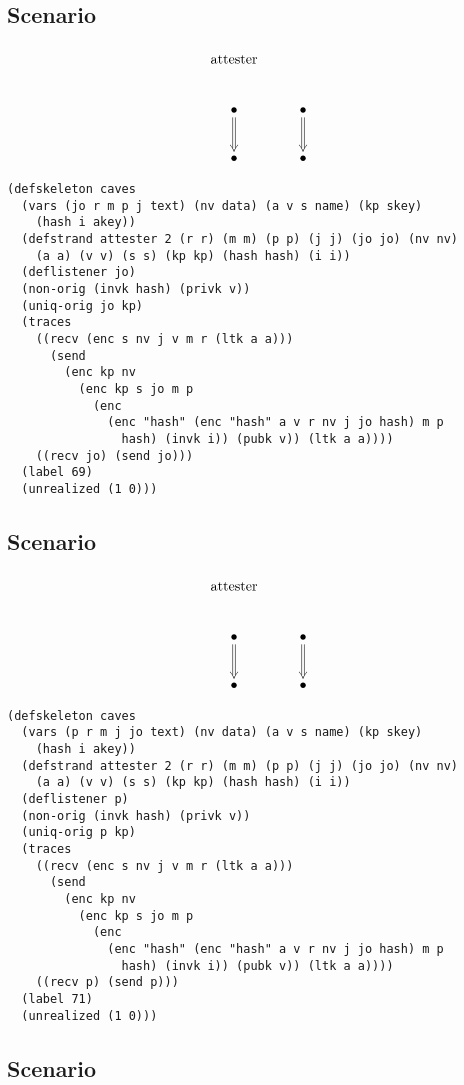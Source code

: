 \documentclass[titlepage,12pt]{article}
\theoremstyle{definition}
\begin{document}
\subsection{Scenario}

$$\xymatrix{
\txt{\strut attester}&\txt{\strut }\\
\bullet\ar@{=>}[d]&\bullet\ar@{=>}[d]\\
\bullet&\bullet}$$

\begin{verbatim}
(defskeleton caves
  (vars (jo r m p j text) (nv data) (a v s name) (kp skey)
    (hash i akey))
  (defstrand attester 2 (r r) (m m) (p p) (j j) (jo jo) (nv nv)
    (a a) (v v) (s s) (kp kp) (hash hash) (i i))
  (deflistener jo)
  (non-orig (invk hash) (privk v))
  (uniq-orig jo kp)
  (traces
    ((recv (enc s nv j v m r (ltk a a)))
      (send
        (enc kp nv
          (enc kp s jo m p
            (enc
              (enc "hash" (enc "hash" a v r nv j jo hash) m p
                hash) (invk i)) (pubk v)) (ltk a a))))
    ((recv jo) (send jo)))
  (label 69)
  (unrealized (1 0)))
\end{verbatim}

\subsection{Scenario}

$$\xymatrix{
\txt{\strut attester}&\txt{\strut }\\
\bullet\ar@{=>}[d]&\bullet\ar@{=>}[d]\\
\bullet&\bullet}$$

\begin{verbatim}
(defskeleton caves
  (vars (p r m j jo text) (nv data) (a v s name) (kp skey)
    (hash i akey))
  (defstrand attester 2 (r r) (m m) (p p) (j j) (jo jo) (nv nv)
    (a a) (v v) (s s) (kp kp) (hash hash) (i i))
  (deflistener p)
  (non-orig (invk hash) (privk v))
  (uniq-orig p kp)
  (traces
    ((recv (enc s nv j v m r (ltk a a)))
      (send
        (enc kp nv
          (enc kp s jo m p
            (enc
              (enc "hash" (enc "hash" a v r nv j jo hash) m p
                hash) (invk i)) (pubk v)) (ltk a a))))
    ((recv p) (send p)))
  (label 71)
  (unrealized (1 0)))
\end{verbatim}

\subsection{Scenario}
\end{document}
